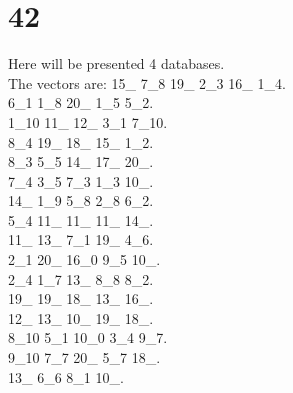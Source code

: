 \chapter{42}
\indent Here will be presented 4 databases.\\
The vectors are:
15\_ 7\_8 19\_ 2\_3 16\_ 1\_4.\\6\_1 1\_8 20\_ 1\_5 5\_2.\\1\_10 11\_ 12\_ 3\_1 7\_10.\\8\_4 19\_ 18\_ 15\_ 1\_2.\\8\_3 5\_5 14\_ 17\_ 20\_.\\7\_4 3\_5 7\_3 1\_3 10\_.\\14\_ 1\_9 5\_8 2\_8 6\_2.\\5\_4 11\_ 11\_ 11\_ 14\_.\\11\_ 13\_ 7\_1 19\_ 4\_6.\\2\_1 20\_ 16\_0 9\_5 10\_.\\2\_4 1\_7 13\_ 8\_8 8\_2.\\19\_ 19\_ 18\_ 13\_ 16\_.\\12\_ 13\_ 10\_ 19\_ 18\_.\\8\_10 5\_1 10\_0 3\_4 9\_7.\\9\_10 7\_7 20\_ 5\_7 18\_.\\13\_ 6\_6 8\_1 10\_.\\